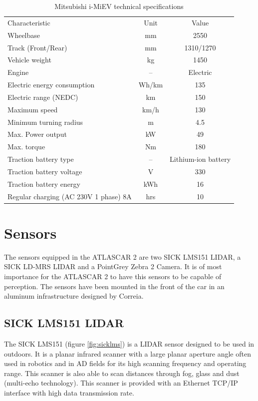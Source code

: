 \begin{table}[!h]
	\centering
	\caption{Mitsubishi i-MiEV technical specifications}
	\label{tab: MiEV technical}
	\begin{tabular}{lcc}
		Characteristic & Unit & Value\\
		Wheelbase & mm & 2550\\
		Track (Front/Rear) & mm & 1310/1270 \\
		Vehicle weight & kg  & 1450 \\
		\hline
		Engine & -- & Electric \\
		Electric energy consumption & Wh/km & 135 \\
		Electric range (NEDC)  & km & 150 \\
		Maximum speed & km/h & 130 \\
		Minimum turning radius & m & 4.5 \\
		Max. Power output & kW & 49 \\
		Max. torque & Nm & 180 \\
		\hline
		Traction battery type & -- & Lithium-ion battery \\
		Traction battery voltage & V & 330 \\
		Traction battery energy & kWh & 16 \\
		Regular charging (AC 230V 1 phase) 8A & hrs & 10 \\
	\end{tabular}
\end{table}

\section{Sensors}

The sensors equipped in the ATLASCAR 2 are two SICK LMS151 LIDAR, a SICK LD-MRS LIDAR and a PointGrey Zebra 2 Camera. It is of most importance for the ATLASCAR 2 to have this sensors to be capable of perception. The sensors have been mounted in the front of the car in an aluminum infrastructure designed by Correia. \cite{Correia2017}

\subsection{SICK LMS151 LIDAR}

The SICK LMS151 (figure \ref{fig:sicklms}) is a LIDAR sensor designed to be used in outdoors. It is a planar infrared scanner with a large planar aperture angle often used in robotics and in AD fields for its high scanning frequency and operating range. This scanner is also able to scan distances through fog, glass and dust (multi-echo technology). This scanner is provided with an Ethernet TCP/IP interface with high data transmission rate. \cite{SICK}

